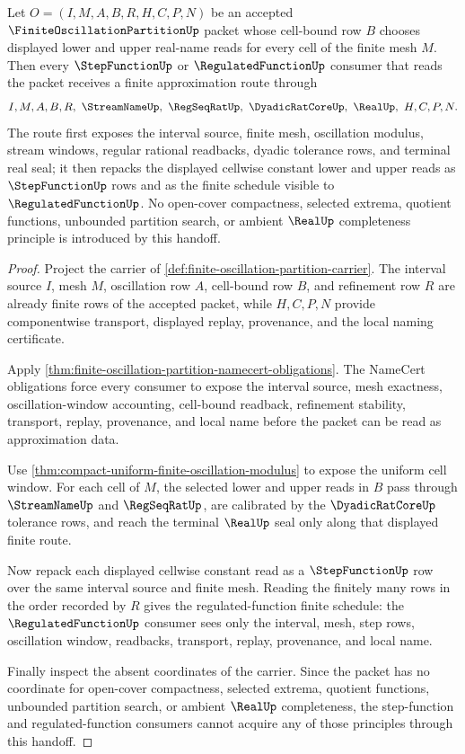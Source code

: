 \begin{theorem}
\label{thm:finite-oscillation-partition-step-function-handoff}
Let $O=(I,M,A,B,R,H,C,P,N)$ be an accepted $\FiniteOscillationPartitionUp$ packet whose cell-bound row $B$ chooses displayed lower and upper real-name reads for every cell of the finite mesh $M$. Then every $\StepFunctionUp$ or $\RegulatedFunctionUp$ consumer that reads the packet receives a finite approximation route through
$$
I,M,A,B,R,\ \StreamNameUp,\ \RegSeqRatUp,\ \DyadicRatCoreUp,\ \RealUp,\ H,C,P,N .
$$
The route first exposes the interval source, finite mesh, oscillation modulus, stream windows, regular rational readbacks, dyadic tolerance rows, and terminal real seal; it then repacks the displayed cellwise constant lower and upper reads as $\StepFunctionUp$ rows and as the finite schedule visible to $\RegulatedFunctionUp$. No open-cover compactness, selected extrema, quotient functions, unbounded partition search, or ambient $\RealUp$ completeness principle is introduced by this handoff.
\end{theorem}
\begin{proof}
Project the carrier of \autoref{def:finite-oscillation-partition-carrier}. The interval source $I$, mesh $M$, oscillation row $A$, cell-bound row $B$, and refinement row $R$ are already finite rows of the accepted packet, while $H,C,P,N$ provide componentwise transport, displayed replay, provenance, and the local naming certificate.

Apply \autoref{thm:finite-oscillation-partition-namecert-obligations}. The NameCert obligations force every consumer to expose the interval source, mesh exactness, oscillation-window accounting, cell-bound readback, refinement stability, transport, replay, provenance, and local name before the packet can be read as approximation data.

Use \autoref{thm:compact-uniform-finite-oscillation-modulus} to expose the uniform cell window. For each cell of $M$, the selected lower and upper reads in $B$ pass through $\StreamNameUp$ and $\RegSeqRatUp$, are calibrated by the $\DyadicRatCoreUp$ tolerance rows, and reach the terminal $\RealUp$ seal only along that displayed finite route.

Now repack each displayed cellwise constant read as a $\StepFunctionUp$ row over the same interval source and finite mesh. Reading the finitely many rows in the order recorded by $R$ gives the regulated-function finite schedule: the $\RegulatedFunctionUp$ consumer sees only the interval, mesh, step rows, oscillation window, readbacks, transport, replay, provenance, and local name.

Finally inspect the absent coordinates of the carrier. Since the packet has no coordinate for open-cover compactness, selected extrema, quotient functions, unbounded partition search, or ambient $\RealUp$ completeness, the step-function and regulated-function consumers cannot acquire any of those principles through this handoff.
\end{proof}

